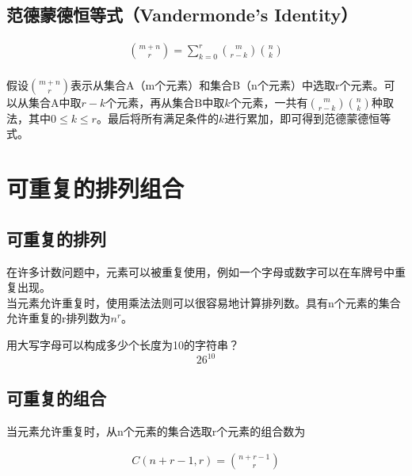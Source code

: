 \vspace{0.5cm}

\subsection{范德蒙德恒等式（Vandermonde's Identity）}

\begin{tcolorbox}
	\begin{align}
		{m+n \choose r} = \sum_{k=0}^r {m \choose r-k} {n \choose k}
	\end{align}
	\\
	假设$ m+n \choose r $表示从集合A（m个元素）和集合B（n个元素）中选取r个元素。可以从集合A中取$ r - k $个元素，再从集合B中取$ k $个元素，一共有$ {m \choose r-k} {n \choose k} $种取法，其中$ 0 \le k \le r $。最后将所有满足条件的$ k $进行累加，即可得到范德蒙德恒等式。
\end{tcolorbox}

\newpage

\section{可重复的排列组合}

\subsection{可重复的排列}

在许多计数问题中，元素可以被重复使用，例如一个字母或数字可以在车牌号中重复出现。\\

当元素允许重复时，使用乘法法则可以很容易地计算排列数。具有n个元素的集合允许重复的r排列数为$ n^r $。

\begin{tcolorbox}
	用大写字母可以构成多少个长度为10的字符串？
	$$
		26^{10}
	$$
\end{tcolorbox}

\vspace{0.5cm}

\subsection{可重复的组合}

当元素允许重复时，从n个元素的集合选取r个元素的组合数为

\vspace{-1cm}

\begin{align}
	C(n+r-1, r) = {n+r-1 \choose r}
\end{align}

